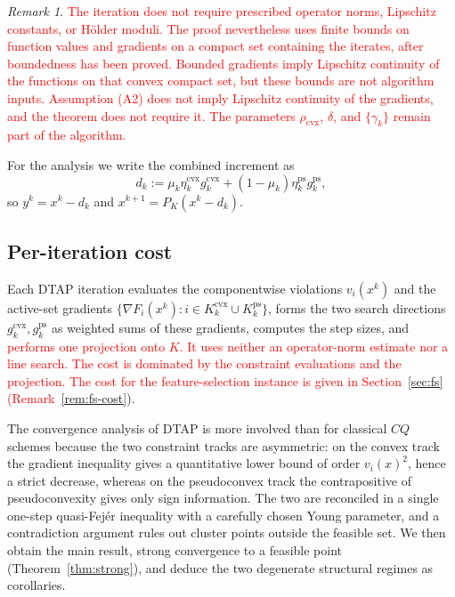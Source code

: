 \documentclass[]{interact}
\theoremstyle{plain}
\theoremstyle{definition}
\theoremstyle{remark}
\newtheorem{remark}{Remark}
\newcommand{\cvx}{\mathrm{cvx}}
\newcommand{\ps}{\mathrm{ps}}
\newcommand{\dtap}{\textsc{DTAP}}
\begin{document}
\begin{remark}\label{rem:regularity-scope}
\leavevmode\textcolor{red}{The iteration does not require prescribed operator norms, Lipschitz constants, or
H\"older moduli. The proof nevertheless uses finite bounds on function values and
gradients on a compact set containing the iterates, after boundedness has been proved.
Bounded gradients imply Lipschitz continuity of the functions on that convex compact set,
but these bounds are not algorithm inputs. Assumption (A2) does not
imply Lipschitz continuity of the gradients, and the theorem does not require it.
The parameters $\rho_{\cvx}$, $\delta$, and $\{\gamma_k\}$ remain part of the algorithm.}
\end{remark}

For the analysis we write the combined increment as
\begin{equation}\label{eq:dk}
d_k:=\mu_k\eta^{\cvx}_k g^{\cvx}_k+(1-\mu_k)\eta^{\ps}_k g^{\ps}_k,
\end{equation}
so $y^k=x^k-d_k$ and $x^{k+1}=P_K(x^k-d_k)$.
\subsection{Per-iteration cost}\label{ssec:complexity}
Each \dtap{} iteration evaluates the
componentwise violations $v_i(x^k)$ and the active-set gradients $\{\nabla F_i(x^k):i\in
K^{\cvx}_k\cup K^{\ps}_k\}$, forms the two search directions $g^{\cvx}_k,g^{\ps}_k$ as weighted
sums of these gradients, computes the step sizes, and \leavevmode\textcolor{red}{performs one projection onto $K$.
It uses neither an operator-norm estimate nor a line search. The cost is dominated by
the constraint evaluations and the projection. The cost for the feature-selection instance
is given in Section~\ref{sec:fs}
(Remark~\ref{rem:fs-cost}}).

The convergence analysis of \dtap{} is more involved than
for classical $CQ$ schemes because the two constraint tracks are asymmetric: on the
convex track the gradient inequality gives a quantitative lower bound of order
$v_i(x)^2$, hence a strict decrease, whereas on the pseudoconvex track the
contrapositive of pseudoconvexity gives only sign information. The two are reconciled in
a single one-step quasi-Fej\'er inequality with a carefully chosen Young parameter, and a
contradiction argument rules out cluster points outside the feasible set. We then obtain
the main result, strong convergence to a feasible point (Theorem~\ref{thm:strong}), and
deduce the two degenerate structural regimes as corollaries.
\end{document}
